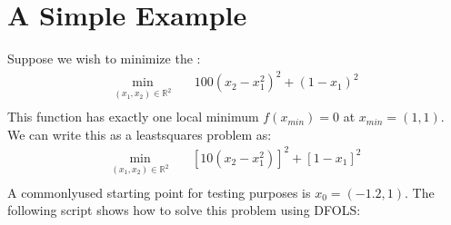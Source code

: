 \documentclass[letterpaper,10pt,english]{sphinxmanual}
\begin{document}
\section{A Simple Example}
\label{\detokenize{userguide:a-simple-example}}
\sphinxAtStartPar
Suppose we wish to minimize the :
\begin{equation*}
\begin{split}\min_{(x_1,x_2)\in\mathbb{R}^2}  &\quad  100(x_2-x_1^2)^2 + (1-x_1)^2 \\\end{split}
\end{equation*}
\sphinxAtStartPar
This function has exactly one local minimum \(f(x_{min})=0\) at \(x_{min}=(1,1)\). We can write this as a least\sphinxhyphen{}squares problem as:
\begin{equation*}
\begin{split}\min_{(x_1,x_2)\in\mathbb{R}^2}  &\quad  [10(x_2-x_1^2)]^2 + [1-x_1]^2 \\\end{split}
\end{equation*}
\sphinxAtStartPar
A commonly\sphinxhyphen{}used starting point for testing purposes is \(x_0=(-1.2,1)\). The following script shows how to solve this problem using DFO\sphinxhyphen{}LS:
\begin{quote}

\begin{sphinxVerbatim}[commandchars=\\\{\}]
 

     \PYG{p}{[}  \PYG{p}{[}\PYG{p}{]}  \PYG{p}{[}\PYG{p}{]}     \PYG{p}{[}\PYG{p}{]}\PYG{p}{]}

  \PYG{p}{[} \PYG{p}{]}

   

\end{sphinxVerbatim}
\end{quote}
\end{document}
